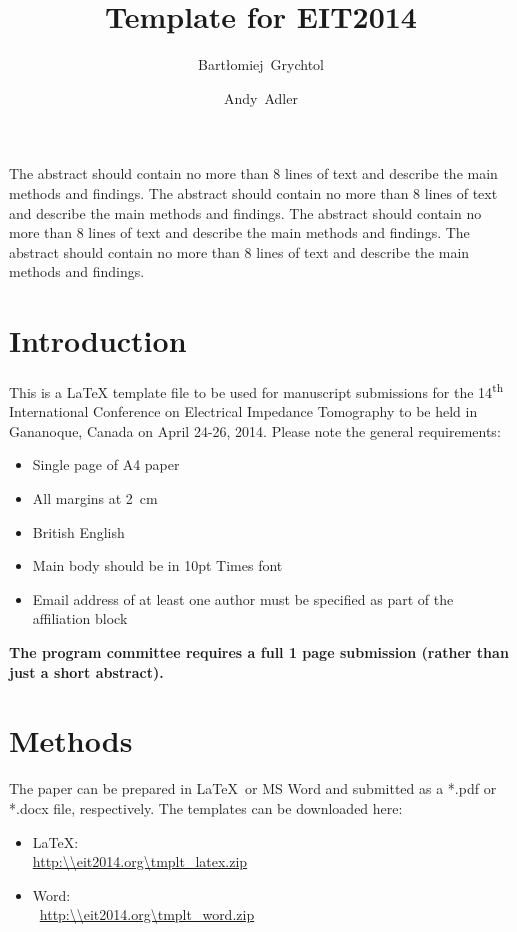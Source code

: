 \documentclass[10pt,a4paper]{article}
\title{Template for EIT2014%
\vspace{-2ex}} %
\author[1]{Bart\l{}omiej~Grychtol}
\author[2]{Andy~Adler}
\affil[1]{German Cancer Research Center, Heidelberg, Germany}
\affil[2]{Carleton University, Ottawa, Canada, \protect\url{info@eit2014.org}}
\date{}
\begin{document}
\maketitle
\vspace{-1.5cm}
\thispagestyle{empty}

\begin{multicols}{2}

 The abstract should contain no more than 8 
lines of text and describe the main methods and findings.
The abstract should contain no more than 8 
lines of text and describe the main methods and findings.
The abstract should contain no more than 8 
lines of text and describe the main methods and findings.
The abstract should contain no more than 8 
lines of text and describe the main methods and findings.

\section{Introduction}
This is a \LaTeX{} template file to be used for manuscript submissions for
the 14\textsuperscript{th} International Conference on Electrical Impedance 
Tomography
to be held in Gananoque, Canada on April 24-26, 2014. Please note the general 
requirements:
\begin{itemize}
\item Single page of A4 paper
\item All margins at 2~cm
\item British English
\item Main body should be in 10pt Times font
\item Email address of at least one author must be specified as part of the 
affiliation block
\end{itemize}
{\bf The program committee requires a full 1 page submission (rather than
just a short abstract).}


\section{Methods} 
The paper can be prepared in \LaTeX\ or MS Word and submitted as a *.pdf or 
*.docx file, 
respectively. The templates can be downloaded here:%
\begin{itemize}
\item \LaTeX:\\\url{http:\\eit2014.org\tmplt_latex.zip}
\item Word:\\\ \url{http:\\eit2014.org\tmplt_word.zip}
\end{itemize}


\end{multicols}
\end{document}
